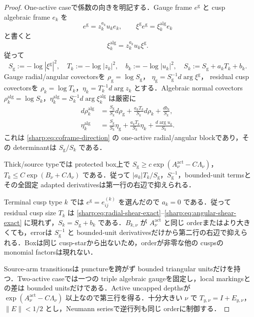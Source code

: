 \documentclass[a4paper,11pt]{ltjsarticle}
\numberwithin{equation}{section}
\theoremstyle{plain}
\theoremstyle{definition}
\theoremstyle{remark}
\begin{document}
\begin{proof}
One-active caseで係数の向きを明記する．Gauge frame $e^{\mathrm g}$ と cusp algebraic frame $e_k$ を
\[
 e^{\mathrm g}=z_k^{a_k}u_ke_k,
 \qquad
 \xi^{\mathrm g}e^{\mathrm g}=\xi_k^{\mathrm{alg}}e_k
\]
と書くと
\begin{equation}\label{sharp:eq:coefficient-direction}
 \xi_k^{\mathrm{alg}}=z_k^{a_k}u_k\xi^{\mathrm g}.
\end{equation}
従って
\[
 S_{\mathrm g}:=-\log|\xi^{\mathrm g}|^2,
 \quad T_k:=-\log|z_k|^2,
 \quad b_k:=-\log|u_k|^2,
 \quad S_k:=S_{\mathrm g}+a_kT_k+b_k.
\]
Gauge radial/angular covectorsを
$\rho_{\mathrm g}=\log S_{\mathrm g}$，
$\eta_{\mathrm g}=S_{\mathrm g}^{-1}d\arg\xi^{\mathrm g}$，
residual cusp covectorsを $\rho_k=\log T_k$，$\eta_k=T_k^{-1}d\arg z_k$ とする．Algebraic normal covectors $\rho_k^{\mathrm{alg}}=\log S_k$，$\eta_k^{\mathrm{alg}}=S_k^{-1}d\arg\xi_k^{\mathrm{alg}}$ は厳密に
\begin{align}
 d\rho_k^{\mathrm{alg}}
 &=\frac{S_{\mathrm g}}{S_k}d\rho_{\mathrm g}
   +\frac{a_kT_k}{S_k}d\rho_k
   +\frac{db_k}{S_k},\label{sharp:eq:radial-shear-exact}\\
 \eta_k^{\mathrm{alg}}
 &=\frac{S_{\mathrm g}}{S_k}\eta_{\mathrm g}
   +\frac{a_kT_k}{S_k}\eta_k
   +\frac{d\arg u_k}{S_k}.\label{sharp:eq:angular-shear-exact}
\end{align}
これは \eqref{sharp:eq:coframe-direction} の one-active radial/angular blockであり，その determinantは $S_{\mathrm g}/S_k$ である．

Thick/source typeでは protected box上で
$S_{\mathrm g}\ge c\exp(A_\nu^{\mathrm{act}}-C\Lambda_\nu)$，
$T_k\le C\exp(B_\nu+C\Lambda_\nu)$ である．従って $|a_k|T_k/S_{\mathrm g}$，$S_{\mathrm g}^{-1}$，bounded-unit termsとその全固定 adapted derivativesは第一行の右辺で抑えられる．

Terminal cusp type $k$ では $e^{\mathrm g}=e^{(k)}_{ij}$ を選んだので $a_k=0$ である．従って residual cusp size $T_k$ は \eqref{sharp:eq:radial-shear-exact}--\eqref{sharp:eq:angular-shear-exact} に現れず，$S_k=S_{\mathrm g}+b_k$ である．$B_{k,\nu}$ が $A_\nu^{\mathrm{act}}$ と同じ orderまたはより大きくても，errorは $S_{\mathrm g}^{-1}$ と bounded-unit derivativesだけから第二行の右辺で抑えられる．Boxは同じ cusp-starから出ないため，orderが非零な他の cuspsの monomial factorsは現れない．

Source-arm transitionsは punctureを跨がず bounded triangular unitsだけを持つ．Two-active caseでは一つの triple algebraic gaugeを固定し，local markingsとの差は bounded unitsだけである．Active uncapped depthsが $\exp(A_\nu^{\mathrm{act}}-C\Lambda_\nu)$ 以上なので第三行を得る．十分大きい $\nu$ で $T_{y,\nu}=I+E_{y,\nu}$，$\|E\|<1/2$ とし，Neumann seriesで逆行列も同じ orderに制御する．
\end{proof}
\end{document}
